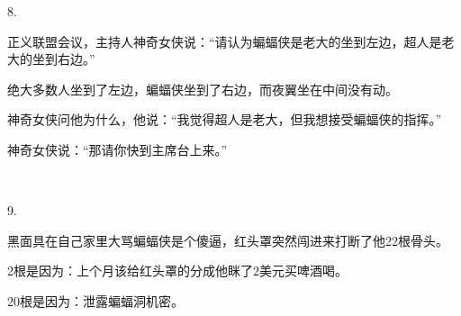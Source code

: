 8.

正义联盟会议，主持人神奇女侠说：“请认为蝙蝠侠是老大的坐到左边，超人是老大的坐到右边。”

绝大多数人坐到了左边，蝙蝠侠坐到了右边，而夜翼坐在中间没有动。

神奇女侠问他为什么，他说：“我觉得超人是老大，但我想接受蝙蝠侠的指挥。”

神奇女侠说：“那请你快到主席台上来。”

~\

9.

黑面具在自己家里大骂蝙蝠侠是个傻逼，红头罩突然闯进来打断了他22根骨头。

2根是因为：上个月该给红头罩的分成他眯了2美元买啤酒喝。

20根是因为：泄露蝙蝠洞机密。